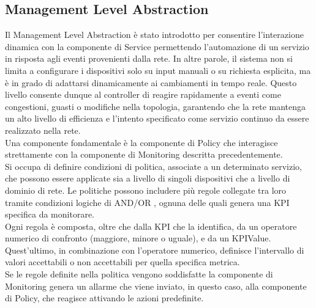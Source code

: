 \subsection{Management Level Abstraction}
Il Management Level Abstraction è stato introdotto per consentire l'interazione dinamica con la componente di Service permettendo l'automazione di un servizio in risposta agli eventi provenienti dalla rete.
In altre parole, il sistema non si limita a configurare i dispositivi solo su input manuali o su richiesta esplicita, ma è in grado di adattarsi dinamicamente ai cambiamenti in tempo reale. 
Questo livello consente dunque al controller di reagire rapidamente a eventi come congestioni, guasti o modifiche nella topologia, garantendo che la rete mantenga un alto livello di efficienza e l'intento
specificato come servizio continuo da essere realizzato nella rete. 
\\Una componente fondamentale è la componente di Policy che interagisce strettamente con la componente di Monitoring descritta precedentemente.
\\Si occupa di definire condizioni di politica, associate a un determinato servizio, che possono essere applicate sia a livello di singoli dispositivi che a livello di dominio di rete.
Le politiche possono includere più regole collegate tra loro tramite condizioni logiche di AND/OR \cite{D32}, ognuna delle quali genera una KPI specifica da monitorare.
\\Ogni regola è composta, oltre che dalla KPI che la identifica, da un operatore numerico di confronto (maggiore, minore o uguale), e da un KPIValue.
Quest'ultimo, in combinazione con l'operatore numerico, definisce l'intervallo di valori accettabili o non accettabili per quella specifica metrica.
\\Se le regole definite nella politica vengono soddisfatte la componente di Monitoring genera un allarme che viene inviato, in questo caso, alla componente di Policy, che reagisce attivando le azioni predefinite.
